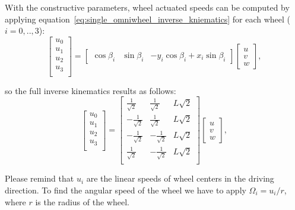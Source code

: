 With the constructive parameters, wheel actuated speeds can be computed by applying equation~\ref{eq:single_omniwheel_inverse_kniematics} for each wheel ($i=0,..,3$):
\begin{equation}
\left[
\begin{array}{c}
u_0 \\
u_1 \\
u_2 \\
u_3 \\
\end{array}
\right]
=
\left[
\begin{array}{ccc}
 \cos \beta_i & \sin \beta_i & -y_i\cos \beta_i+x_i \sin \beta_i
\end{array}
\right]
\left[
\begin{array}{c}
 u \\
 v\\
 w
\end{array}
\right], 
\end{equation}

so the full inverse kinematics results as follows: 
\begin{equation}
\left[
\begin{array}{c}
u_0 \\
u_1 \\
u_2 \\
u_3 \\
\end{array}
\right]
=
\left[
\begin{array}{ccc}
 \frac{1}{\sqrt{2}} & \frac{1}{\sqrt{2}} & L\sqrt{2} \\
 -\frac{1}{\sqrt{2}} & \frac{1}{\sqrt{2}} & L\sqrt{2} \\
 -\frac{1}{\sqrt{2}} & -\frac{1}{\sqrt{2}} & L\sqrt{2} \\
 \frac{1}{\sqrt{2}} & -\frac{1}{\sqrt{2}} & L\sqrt{2} \\
\end{array}
\right]
\left[
\begin{array}{c}
 u \\
 v\\
 w
\end{array}
\right], 
\end{equation}

Please remind that $u_i$ are the linear speeds of wheel centers in the driving direction. To find the angular speed of the wheel we have to apply $\Omega_i = u_i/r$, where $r$ is the radius of the wheel. 



